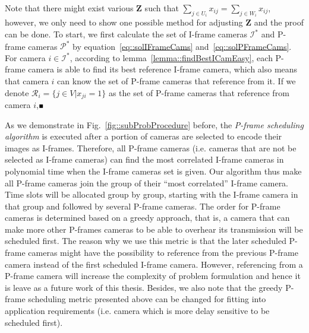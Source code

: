 Note that there might exist various $\mathbf{Z}$ such that ${\underset{j \in U_i}{\sum} x_{ij} = \underset{j \in W_i}{\sum} x_{ij}}$, however, we only need to show one possible method for adjusting $\mathbf{Z}$ and the proof can be done.
To start, we first calculate the set of I-frame cameras $\mathcal{I}^*$ and P-frame cameras $\mathcal{P}^*$ by equation~\eqref{eq::solIFrameCams} and~\eqref{eq::solPFrameCams}.
For camera $i \in \mathcal{I}^*$, according to lemma~\ref{lemma::findBestICamEasy}, each P-frame camera is able to find its best reference I-frame camera, which also means that camera $i$ can know the set of P-frame cameras that reference from it.
If we denote ${\mathcal{R}_i= \{j \in V|x_{ji} = 1\}}$ as the set of P-frame cameras that reference from camera $i$,$\mathsmaller{\mathsmaller{\blacksquare}}$

As we demonstrate in Fig.~\ref{fig::subProbProcedure} before, the \emph{P-frame scheduling algorithm} is executed after a portion of cameras are selected to encode their images as I-frames.
Therefore, all P-frame cameras (i.e. cameras that are not be selected as I-frame cameras) can find the most correlated I-frame cameras in polynomial time when the I-frame cameras set is given.
Our algorithm thus make all P-frame cameras join the group of their ``most correlated'' I-frame camera.
Time slots will be allocated group by group, starting with the I-frame camera in that group and followed by several P-frame cameras.
The order for P-frame cameras is determined based on a greedy approach, that is, a camera that can make more other P-frames cameras to be able to overhear its transmission will be scheduled first.
The reason why we use this metric is that the later scheduled P-frame cameras might have the possibility to reference from the previous P-frame camera instead of the first scheduled I-frame camera.
However, referencing from a P-frame camera will increase the complexity of problem formulation and hence it is leave as a future work of this thesis.
Besides, we also note that the greedy P-frame scheduling metric presented above can be changed for fitting into application requirements (i.e. camera which is more delay sensitive to be scheduled first).


